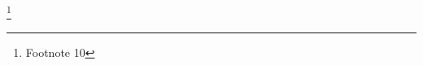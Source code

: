 \documentclass{article}
\begin{document}
\setcounter{footnote}{10}
\footnote{Footnote 10}
\end{document}
